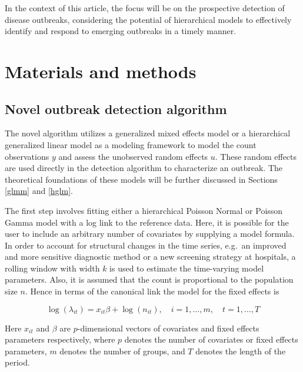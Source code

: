\documentclass[preprint, 3p, authoryear]{elsarticle} %
\begin{document}
In the context of this article, the focus will be on the prospective detection of disease outbreaks, considering the potential of hierarchical models to effectively identify and respond to emerging outbreaks in a timely manner.

\hypertarget{materials-and-methods}{%
\section{Materials and methods}\label{materials-and-methods}}

\hypertarget{novel-outbreak-detection-algorithm}{%
\subsection{Novel outbreak detection algorithm}\label{novel-outbreak-detection-algorithm}}

The novel algorithm utilizes a generalized mixed effects model or a hierarchical generalized linear model as a modeling framework to model the count observations \(y\) and assess the unobserved random effects \(u\). These random effects are used directly in the detection algorithm to characterize an outbreak. The theoretical foundations of these models will be further discussed in Sections \ref{glmm} and \ref{hglm}.

The first step involves fitting either a hierarchical Poisson Normal or Poisson Gamma model with a log link to the reference data. Here, it is possible for the user to include an arbitrary number of covariates by supplying a model formula. In order to account for structural changes in the time series, e.g.~an improved and more sensitive diagnostic method or a new screening strategy at hospitals, a rolling window with width \(k\) is used to estimate the time-varying model parameters. Also, it is assumed that the count is proportional to the population size \(n\). Hence in terms of the canonical link the model for the fixed effects is

\begin{equation}
  \log(\lambda_{it}) = x_{it}\beta + \log(n_{it}), \quad i=1,\dots,m, \quad t=1,\dots,T
\end{equation}

Here \(x_{it}\) and \(\beta\) are \(p\)-dimensional vectors of covariates and fixed effects parameters respectively, where \(p\) denotes the number of covariates or fixed effects parameters, \(m\) denotes the number of groups, and \(T\) denotes the length of the period.
\end{document}
